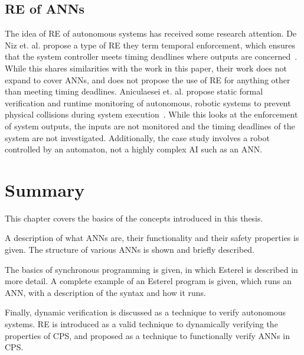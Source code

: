 \subsection{\acf{RE} of \acfp{ANN}}
The idea of \ac{RE} of autonomous systems has received some research attention. 
De Niz et. al. propose a type of \ac{RE} they term temporal enforcement, which ensures that the system controller meets timing deadlines where outputs are concerned~\cite{safe-enforce-auto}. 
While this shares similarities with the work in this paper, their work does not expand to cover \acp{ANN}, and does not propose the use of \ac{RE} for anything other than meeting timing deadlines.
Aniculaesei et. al. propose static formal verification and runtime monitoring of autonomous, robotic systems to prevent physical collisions during system execution~\cite{runtime-monitor}.
While this looks at the enforcement of system outputs, the inputs are not monitored and the timing deadlines of the system are not investigated. 
Additionally, the case study involves a robot controlled by an automaton, not a highly complex \ac{AI} such as an \ac{ANN}.





\section{Summary}
This chapter covers the basics of the concepts introduced in this thesis.

A description of what \acp{ANN} are, their functionality and their safety properties is given.
The structure of various \acp{ANN} is shown and briefly described.

The basics of synchronous programming is given, in which Esterel is described in more detail.
A complete example of an Esterel program is given, which runs an \ac{ANN}, with a description of the syntax and how it runs.

Finally, dynamic verification is discussed as a technique to verify autonomous systems.
\ac{RE} is introduced as a valid technique to dynamically verifying the properties of \ac{CPS}, and proposed as a technique to functionally verify \acp{ANN} in \ac{CPS}.
